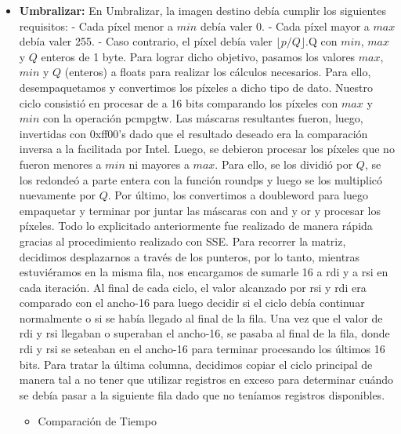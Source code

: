 \documentclass[10pt, a4paper]{article}
\begin{document}
\begin{itemize}
\item {\textbf{Umbralizar:}}
En Umbralizar, la imagen destino debía cumplir los siguientes requisitos:\newline
- Cada píxel menor a $min$ debía valer 0.\newline
- Cada píxel mayor a $max$ debía valer 255.\newline
- Caso contrario, el píxel debía valer $\lfloor p/Q \rfloor$.Q\newline
con $min$, $max$ y $Q$ enteros de 1 byte.\newline
\newline
Para lograr dicho objetivo, pasamos los valores $max$, $min$ y $Q$ (enteros) a floats para realizar los cálculos necesarios. Para ello, desempaquetamos y convertimos los píxeles a dicho tipo de dato.\newline
Nuestro ciclo consistió en procesar de a 16 bits comparando los píxeles con $max$ y $min$ con la operación pcmpgtw. Las máscaras resultantes fueron, luego, invertidas con 0xff00's dado que el resultado deseado era la comparación inversa a la facilitada por Intel. Luego, se debieron procesar los píxeles que no fueron menores a $min$ ni mayores a $max$. Para ello, se los dividió por $Q$, se los redondeó a parte entera con la función roundps y luego se los multiplicó nuevamente por $Q$. Por último, los convertimos a doubleword para luego empaquetar y terminar por juntar las máscaras con and y or y procesar los píxeles. Todo lo explicitado anteriormente fue realizado de manera rápida gracias al procedimiento realizado con SSE.\newline
Para recorrer la matriz, decidimos desplazarnos a través de los punteros, por lo tanto, mientras estuviéramos en la misma fila, nos encargamos de sumarle 16 a rdi y a rsi en cada iteración. Al final de cada ciclo, el valor alcanzado por rsi y rdi era comparado con el ancho-16 para luego decidir si el ciclo debía continuar normalmente o si se había llegado al final de la fila. Una vez que el valor de rdi y rsi llegaban o superaban el ancho-16, se pasaba al final de la fila, donde rdi y rsi se seteaban en el ancho-16 para terminar procesando los últimos 16 bits. Para tratar la última columna, decidimos copiar el ciclo principal de manera tal a no tener que utilizar registros en exceso para determinar cuándo se debía pasar a la siguiente fila dado que no teníamos registros disponibles.\newline
\begin{itemize}
\item{Comparación de Tiempo}
\end{itemize}


\end{itemize}
\end{document}
